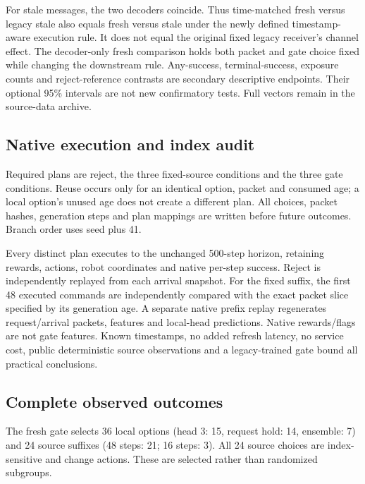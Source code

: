 For stale messages, the two decoders coincide. Thus time-matched fresh versus legacy stale also equals fresh versus stale under the newly defined timestamp-aware execution rule. It does not equal the original fixed legacy receiver's channel effect. The decoder-only fresh comparison holds both packet and gate choice fixed while changing the downstream rule. Any-success, terminal-success, exposure counts and reject-reference contrasts are secondary descriptive endpoints. Their optional 95\% intervals are not new confirmatory tests. Full vectors remain in the source-data archive.

\subsection{Native execution and index audit}
Required plans are reject, the three fixed-source conditions and the three gate conditions. Reuse occurs only for an identical option, packet and consumed age; a local option's unused age does not create a different plan. All choices, packet hashes, generation steps and plan mappings are written before future outcomes. Branch order uses seed plus 41.

Every distinct plan executes to the unchanged 500-step horizon, retaining rewards, actions, robot coordinates and native per-step success. Reject is independently replayed from each arrival snapshot. For the fixed suffix, the first 48 executed commands are independently compared with the exact packet slice specified by its generation age. A separate native prefix replay regenerates request/arrival packets, features and local-head predictions. Native rewards/flags are not gate features. Known timestamps, no added refresh latency, no service cost, public deterministic source observations and a legacy-trained gate bound all practical conclusions.

\subsection{Complete observed outcomes}

The fresh gate selects 36 local options (head 3: 15, request hold: 14, ensemble: 7) and 24 source suffixes (48 steps: 21; 16 steps: 3). All 24 source choices are index-sensitive and change actions. These are selected rather than randomized subgroups.
